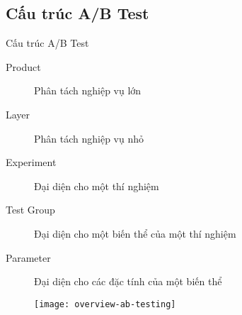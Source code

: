 


\subsection{Cấu trúc A/B Test}

\begin{frame}{Cấu trúc A/B Test}
	\begin{description}
		\item[Product] Phân tách nghiệp vụ lớn
		\item[Layer] Phân tách nghiệp vụ nhỏ
		\item[Experiment] Đại diện cho một thí nghiệm
		\item[Test Group] Đại diện cho một biến thể của một thí nghiệm
		\item[Parameter] Đại diện cho các đặc tính của một biến thể
	\end{description}
	\begin{figure}
		\texttt{[image: overview-ab-testing]}
	\end{figure}
\end{frame}

